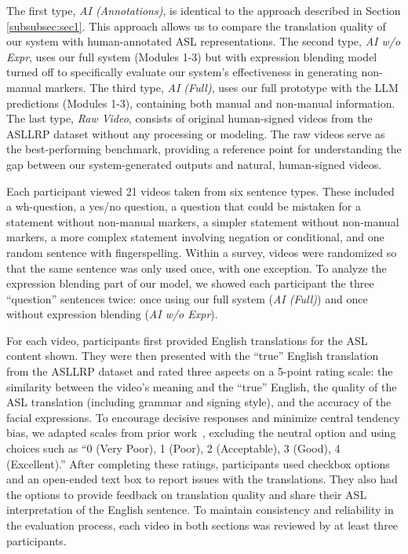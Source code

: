 The first type, \textit{AI (Annotations)}, is identical to the approach described in Section \ref{subsubsec:sec1}. This approach allows us to compare the translation quality of our system with human-annotated ASL representations.  The second type, \textit{AI w/o Expr}, uses our full system (Modules 1-3) but with expression blending model turned off to specifically evaluate our system's effectiveness in generating non-manual markers. The third type, \textit{AI (Full)}, uses our full prototype with the LLM predictions (Modules 1-3), containing both manual and non-manual information. The last type, \textit{Raw Video}, consists of original human-signed videos from the ASLLRP dataset without any processing or modeling. The raw videos serve as the best-performing benchmark, providing a reference point for understanding the gap between our system-generated outputs and natural, human-signed videos.


Each participant viewed 21 videos taken from six sentence types. These included a wh-question, a yes/no question, a question that could be mistaken for a statement without non-manual markers, a simpler statement without non-manual markers, a more complex statement involving negation or conditional, and one random sentence with fingerspelling. Within a survey, videos were randomized so that the same sentence was only used once, with one exception. To analyze the expression blending part of our model, we showed each participant the three ``question'' sentences twice: once using our full system (\textit{AI (Full)}) and once without expression blending (\textit{AI w/o Expr}). 

For each video, participants first provided English translations for the ASL content shown. They were then presented with the ``true'' English translation from the ASLLRP dataset and rated three aspects on a 5-point rating scale: the similarity between the video's meaning and the ``true'' English, the quality of the ASL translation (including grammar and signing style), and the accuracy of the facial expressions. To encourage decisive responses and minimize central tendency bias, we adapted scales from prior work~\cite{zhu_neural_2023}, excluding the neutral option and using choices such as ``0 (Very Poor), 1 (Poor), 2 (Acceptable), 3 (Good), 4 (Excellent).'' After completing these ratings, participants used checkbox options and an open-ended text box to report issues with the translations. They also had the options to provide feedback on translation quality and share their ASL interpretation of the English sentence. To maintain consistency and reliability in the evaluation process, each video in both sections was reviewed by at least three participants. 

